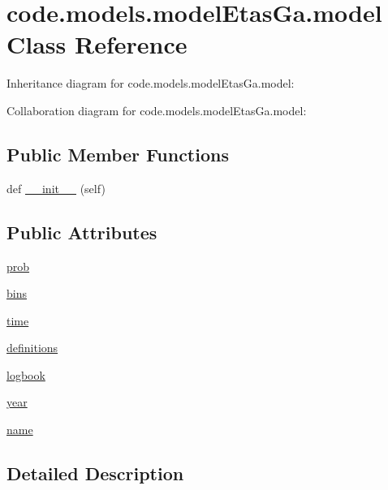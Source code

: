 \hypertarget{classcode_1_1models_1_1model_etas_ga_1_1model}{}\section{code.\+models.\+model\+Etas\+Ga.\+model Class Reference}
\label{classcode_1_1models_1_1model_etas_ga_1_1model}


Inheritance diagram for code.\+models.\+model\+Etas\+Ga.\+model\+:


Collaboration diagram for code.\+models.\+model\+Etas\+Ga.\+model\+:
\subsection*{Public Member Functions}
\begin{DoxyCompactItemize}
\item 
def \hyperlink{classcode_1_1models_1_1model_etas_ga_1_1model_a159d6241a98d08a44dabc2fda1c381e7}{\+\_\+\+\_\+init\+\_\+\+\_\+} (self)
\end{DoxyCompactItemize}
\subsection*{Public Attributes}
\begin{DoxyCompactItemize}
\item 
\hyperlink{classcode_1_1models_1_1model_etas_ga_1_1model_a9f3d38500ac5166767a1e65757977de2}{prob}
\item 
\hyperlink{classcode_1_1models_1_1model_etas_ga_1_1model_a8957a4e398bcf7b6386d06b5c41bbe58}{bins}
\item 
\hyperlink{classcode_1_1models_1_1model_etas_ga_1_1model_a5a1a4a9a925501aa1e06799f5d53e3df}{time}
\item 
\hyperlink{classcode_1_1models_1_1model_etas_ga_1_1model_a35593cb4b1d88f9bc177c29c66c966f6}{definitions}
\item 
\hyperlink{classcode_1_1models_1_1model_etas_ga_1_1model_a391b0c1c8aa0c8b9d589836086c3a0d1}{logbook}
\item 
\hyperlink{classcode_1_1models_1_1model_etas_ga_1_1model_ac7e4ce27996b07f821cad0e8b24a3968}{year}
\item 
\hyperlink{classcode_1_1models_1_1model_etas_ga_1_1model_a2c46008c2073c162310573400ce125e5}{name}
\end{DoxyCompactItemize}


\subsection{Detailed Description}


